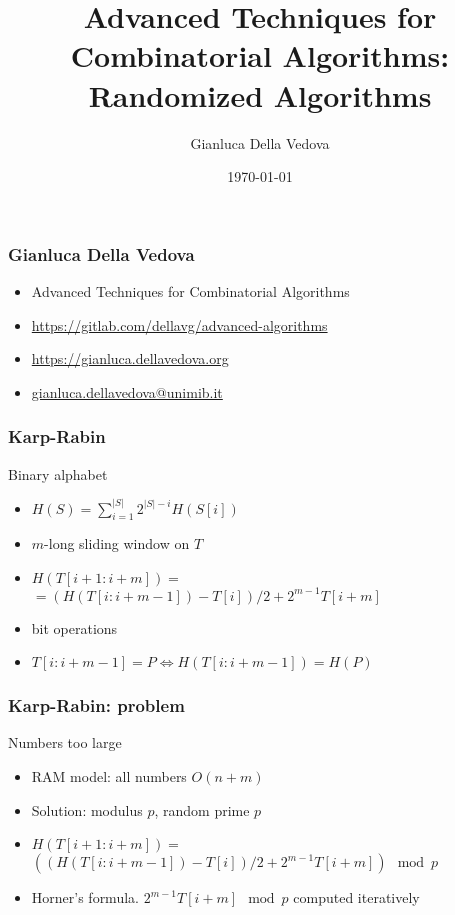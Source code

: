 \documentclass[12pt,aspectratio=169]{beamer}
\author{Gianluca Della Vedova}
\title[Advanced Algorithms]{Advanced Techniques for Combinatorial Algorithms:
Randomized Algorithms}
\institute[]{Univ. Milano--Bicocca\\
  \texttt{https://gianluca.dellavedova.org}}
\date[]{{\tiny \today\hspace{1em} \vcsShortHash}}
\begin{document}
\begin{frame}
  \titlepage
\end{frame}


\begin{frame}\frametitle{Gianluca Della Vedova}
  \begin{itemize}
  \item
                Advanced Techniques for Combinatorial Algorithms
\item
{\small\url{https://gitlab.com/dellavg/advanced-algorithms}}
  \item
{\small\url{https://gianluca.dellavedova.org}}
  \item
{\small\url{gianluca.dellavedova@unimib.it}}
  \end{itemize}
\end{frame}

\begin{frame}[fragile]
\frametitle{Karp-Rabin}
\begin{block}{Binary alphabet}
\begin{itemize}
\item
$H(S)=\sum_{i=1}^{|S|} 2^{|S| - i}H(S[i])$
\item
$m$-long sliding window on $T$
\item
$H(T[i+1:i+m]) =$\\
$=\left(H(T[i:i+m-1]) - T[i] \right) / 2 + 2^{m-1}T[i+m]$
\item
bit operations
\item
$T[i:i+m-1]=P \Leftrightarrow H(T[i:i+m-1])=H(P)$
\end{itemize}
\end{block}
\end{frame}

\begin{frame}[fragile]
\frametitle{Karp-Rabin: problem}
\begin{block}{Numbers too large}
\begin{itemize}
\item
RAM model: all numbers $O(n+m)$
\item
Solution: modulus $p$, random prime $p$
\item
$H(T[i+1:i+m]) =$\\
$\left(\left(H(T[i:i+m-1]) - T[i] \right) / 2 + 2^{m-1}T[i+m] \right)\mod p$
\item
Horner's formula.
%
$2^{m-1}T[i+m] \mod p$ computed iteratively
\end{itemize}
\end{block}
\end{frame}
\end{document}
